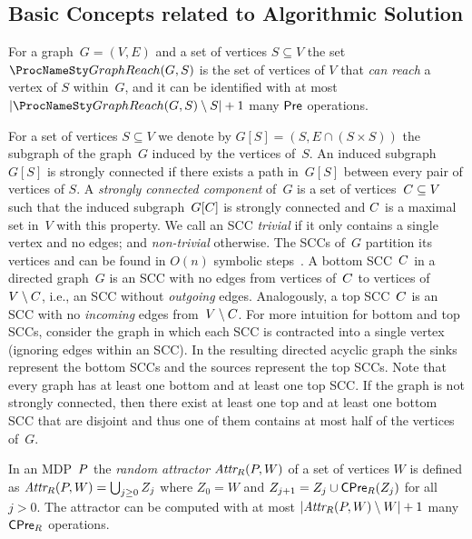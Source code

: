 \vspace{-2mm}
\subsection{Basic Concepts related to Algorithmic Solution}

\vspace{-1mm}
\smallskip{}
For a graph~$G = (V, E)$ and a set of vertices $S \subseteq V$ 
the set $\reachG{G}{S}$ is the set of vertices of $V$ that \emph{can 
reach} a vertex of $S$ within~$G$, and it can be identified with at most
$\lvert \reachG{G}{S} \setminus S \rvert + 1$ many $\mathsf{Pre}$ operations.

\vspace{-0.5mm}
\smallskip{}
For a set of vertices $S \subseteq V$ we denote by 
$G[S] = (S, E \cap (S \times S))$ the subgraph of the graph~$G$ induced by 
the vertices of~$S$. An induced subgraph~$G[S]$ is strongly connected 
if there exists a path in~$G[S]$ between every pair of vertices of $S$.
A \emph{strongly connected component } of~$G$ is a set of 
vertices~$C\subseteq V$ such that the induced subgraph~$G[C]$ is 
strongly connected and $C$ is a maximal set in~$V$ with this property.
We call an SCC \emph{trivial} if it only contains a single 
vertex and no edges; and \emph{non-trivial} otherwise. The SCCs of~$G$ partition
its vertices and can be found in $O(n)$ symbolic steps~\cite{GentiliniPP08}.
A bottom SCC~$C$ in a directed graph~$G$ is an SCC with no edges from 
vertices of~$C$ to vertices of~$V \setminus C$, i.e., an SCC without
\emph{outgoing} edges. Analogously, a top SCC~$C$ is an SCC with no \emph{incoming}
edges from~$V \setminus C$.
For more intuition for bottom and top SCCs, consider the graph in which 
each SCC is contracted into a single vertex (ignoring edges within
an SCC). In the resulting directed acyclic graph the sinks represent the
bottom SCCs and the sources represent the top SCCs.
Note that every graph has at least one bottom and at least one top SCC.
If the graph is not strongly connected, then there exist at least one
top and at least one bottom SCC that are disjoint and thus one of them 
contains at most half of the vertices of~$G$.

\vspace{-0.5mm}
\smallskip{}
In an MDP~$P$ the \emph{random attractor} $\textit{Attr}_{R}(P, W)$  of a set of vertices 
$W$ is defined as $\textit{Attr}_{R}(P, W) =
\bigcup_{j \ge 0} Z_j$ where $Z_0 = W$ and $Z_{j+1} = Z_j \cup \mathsf{CPre}_{R}(Z_j)$
for all $j > 0$. The attractor can be computed with at most
$\lvert \textit{Attr}_{R}(P, W) \setminus  W \rvert + 1$ many $\mathsf{CPre}_{R}$ operations.

